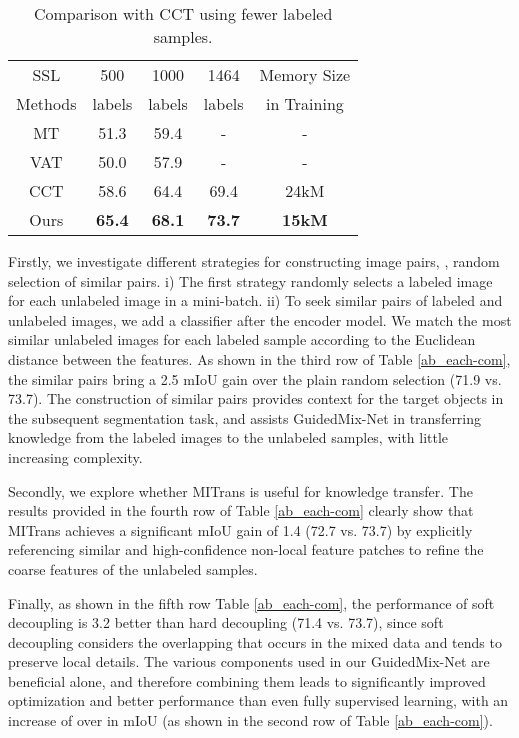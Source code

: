 \begin{table}[h]
\small
\centering
\caption{Comparison with CCT using fewer labeled samples.}
\begin{tabular}{c|c|c|c|c}
\hline
	SSL & 500 & 1000 & 1464 & Memory Size\\
	Methods& labels & labels & labels & in Training \\\hline
	MT \cite{2017Mean} & 51.3 & 59.4 & - & -\\
	VAT \cite{2018Virtual}& 50.0 & 57.9 & - & - \\
	CCT \cite{ouali2020semi}& 58.6 & 64.4 & 69.4 & 24kM \\
	Ours & \textbf{65.4} & \textbf{68.1} & \textbf{73.7} & \textbf{15kM} \\\hline
\end{tabular}
\label{comparison with CCT}
\end{table}


Firstly, we investigate different strategies for constructing image pairs, , random selection of similar pairs.
i) The first strategy randomly selects a labeled image for each unlabeled image in a mini-batch.
ii) To seek similar pairs of labeled and unlabeled images, we add a classifier after the encoder model. 
We match the most similar unlabeled images for each labeled sample according to the Euclidean distance between the features.
As shown in the third row of Table \ref{ab_each-com}, the similar pairs bring a 2.5 mIoU gain over the plain random selection (71.9 vs. 73.7). 
The construction of similar pairs provides context for the target objects in the subsequent segmentation task, and assists GuidedMix-Net in transferring knowledge from the labeled images to the unlabeled samples, with little increasing complexity.

Secondly, we explore whether MITrans is useful for knowledge transfer.
The results provided in the fourth row of Table \ref{ab_each-com} clearly show that MITrans achieves a significant mIoU gain of 1.4 (72.7 vs. 73.7) by explicitly referencing similar and high-confidence non-local feature patches to refine the coarse features of the unlabeled samples.

Finally, as shown in the fifth row Table \ref{ab_each-com}, the performance of soft decoupling is 3.2 better than hard decoupling (71.4 vs. 73.7), since soft decoupling considers the overlapping that occurs in the mixed data and tends to preserve local details.
The various components used in our GuidedMix-Net are beneficial alone, and therefore combining them leads to significantly improved optimization and better performance than even fully supervised learning, with an increase of over  in mIoU (as shown in the second row of Table \ref{ab_each-com}).

